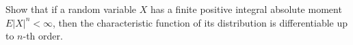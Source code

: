 Show that if a random variable $X$ has a finite positive integral absolute moment $E|X|^n < \infty$, then the characteristic function of its distribution is differentiable up to $n$-th order.
